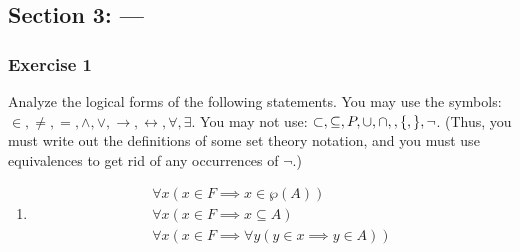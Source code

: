 \begin{questions}

\subsection{Section 3: ---}

\subsubsection{Exercise 1}
\question Analyze the logical forms of the following statements. You may use the
symbols: $\in, \neq, =, \wedge, \vee, \rightarrow, \leftrightarrow, \forall, \exists$.  You may not use: $\subset, \subseteq, P, \cup, \cap, \/, \{, \}, \neg$.  (Thus, you must write out the definitions
of some set theory notation, and you must use equivalences to get rid of
any occurrences of $\neg$.)

\begin{solution}
    \begin{enumerate}[label=(\alph*)]
    \item {
        \begin{align*}
        \forall x (x \in F \implies x \in \wp(A)) \\
        \forall x (x \in F \implies x \subseteq A) \\
        \forall x (x \in F \implies \forall y (y \in x \implies y \in A))
        \end{align*}
    }


\end{enumerate}
\end{solution}
\end{questions}
